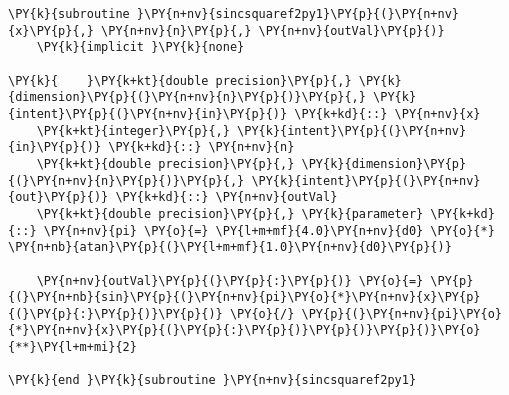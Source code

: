 \begin{Verbatim}[commandchars=\\\{\}]
\PY{k}{subroutine }\PY{n+nv}{sincsquaref2py1}\PY{p}{(}\PY{n+nv}{x}\PY{p}{,} \PY{n+nv}{n}\PY{p}{,} \PY{n+nv}{outVal}\PY{p}{)}
    \PY{k}{implicit }\PY{k}{none}

\PY{k}{    }\PY{k+kt}{double precision}\PY{p}{,} \PY{k}{dimension}\PY{p}{(}\PY{n+nv}{n}\PY{p}{)}\PY{p}{,} \PY{k}{intent}\PY{p}{(}\PY{n+nv}{in}\PY{p}{)} \PY{k+kd}{::} \PY{n+nv}{x}
    \PY{k+kt}{integer}\PY{p}{,} \PY{k}{intent}\PY{p}{(}\PY{n+nv}{in}\PY{p}{)} \PY{k+kd}{::} \PY{n+nv}{n}
    \PY{k+kt}{double precision}\PY{p}{,} \PY{k}{dimension}\PY{p}{(}\PY{n+nv}{n}\PY{p}{)}\PY{p}{,} \PY{k}{intent}\PY{p}{(}\PY{n+nv}{out}\PY{p}{)} \PY{k+kd}{::} \PY{n+nv}{outVal}
    \PY{k+kt}{double precision}\PY{p}{,} \PY{k}{parameter} \PY{k+kd}{::} \PY{n+nv}{pi} \PY{o}{=} \PY{l+m+mf}{4.0}\PY{n+nv}{d0} \PY{o}{*} \PY{n+nb}{atan}\PY{p}{(}\PY{l+m+mf}{1.0}\PY{n+nv}{d0}\PY{p}{)}

    \PY{n+nv}{outVal}\PY{p}{(}\PY{p}{:}\PY{p}{)} \PY{o}{=} \PY{p}{(}\PY{n+nb}{sin}\PY{p}{(}\PY{n+nv}{pi}\PY{o}{*}\PY{n+nv}{x}\PY{p}{(}\PY{p}{:}\PY{p}{)}\PY{p}{)} \PY{o}{/} \PY{p}{(}\PY{n+nv}{pi}\PY{o}{*}\PY{n+nv}{x}\PY{p}{(}\PY{p}{:}\PY{p}{)}\PY{p}{)}\PY{p}{)}\PY{o}{**}\PY{l+m+mi}{2}

\PY{k}{end }\PY{k}{subroutine }\PY{n+nv}{sincsquaref2py1}
\end{Verbatim}
